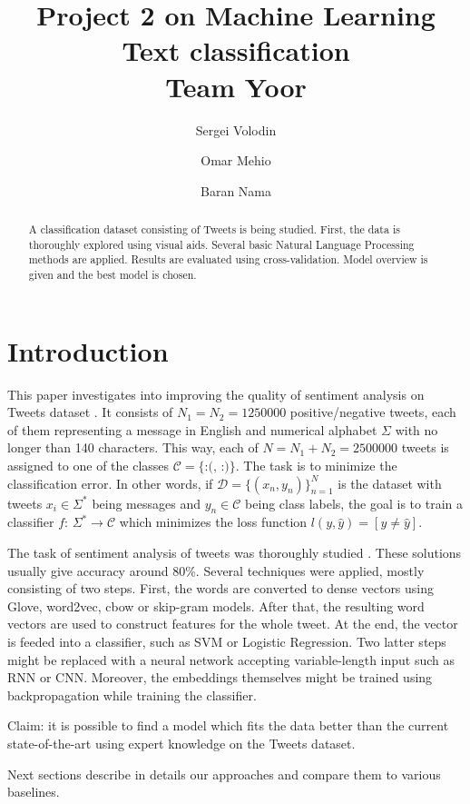 \documentclass[10pt,conference,compsocconf]{IEEEtran}
\title{Project 2 on Machine Learning\\Text classification\\Team Yoor}
\author[1]{Sergei Volodin}
\author[1]{Omar Mehio}
\author[1]{Baran Nama}
\affil[1]{EPFL}
\affil[ ]{\textit {\{sergei.volodin,omar.mehio,baran.nama\}@epfl.ch}}
\begin{document}
\maketitle

\begin{abstract}
A classification dataset consisting of Tweets is being studied. First, the data is thoroughly explored using visual aids. Several basic Natural Language Processing methods are applied. Results are evaluated using cross-validation. Model overview is given and the best model is chosen.
\end{abstract}

\section{Introduction}
This paper investigates into improving the quality of sentiment analysis on Tweets dataset \cite{kaggle}.
It consists of $N_1=N_2=1250000$ positive/negative tweets, each of them representing a message in English and numerical alphabet $\Sigma$ with no longer than 140 characters.
This way, each of $N=N_1+N_2=2500000$ tweets is assigned to one of the classes $\mathcal{C}=\{\mbox{:(},\,\mbox{:)}\}$.
The task is to minimize the classification error.
In other words, if $\mathcal{D}=\{(x_n, y_n)\}_{n=1}^N$ is the dataset with tweets $x_i\in\Sigma^*$ being messages and $y_n\in \mathcal{C}$ being class labels, the goal is to train a classifier $f\colon\, \Sigma^*\to\mathcal{C}$ which minimizes the loss function $l(y,\hat{y})=[y\neq \hat{y}]$.

The task of sentiment analysis of tweets was thoroughly studied \cite{sota1, sota2, sota3, sota4}. These solutions usually give accuracy around 80\%.
Several techniques were applied, mostly consisting of two steps.
First, the words are converted to dense vectors using Glove, word2vec, cbow or skip-gram models.
After that, the resulting word vectors are used to construct features for the whole tweet.
At the end, the vector is feeded into a classifier, such as SVM or Logistic Regression.
Two latter steps might be replaced with a neural network accepting variable-length input such as RNN or CNN.
Moreover, the embeddings themselves might be trained using backpropagation while training the classifier.

Claim: it is possible to find a model which fits the data better than the current state-of-the-art using expert knowledge on the Tweets dataset.

Next sections describe in details our approaches and compare them to various baselines.
\end{document}
